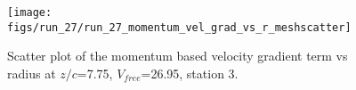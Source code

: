 \begin{figure}[H]
\centering
\texttt{[image: figs/run\_27/run\_27\_momentum\_vel\_grad\_vs\_r\_meshscatter]}
\caption{Scatter plot of the momentum based velocity gradient term vs radius at $z/c$=7.75, $V_{free}$=26.95, station 3.}
\label{fig:run_27_momentum_vel_grad_vs_r_meshscatter}
\end{figure}


